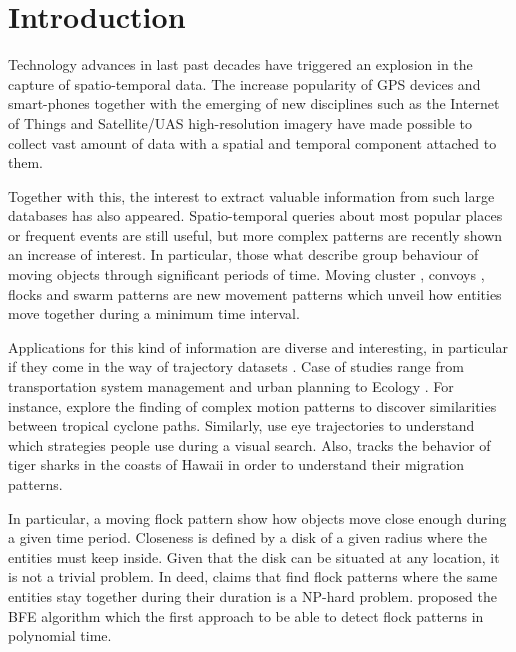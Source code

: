 \section{Introduction}
Technology advances in last past decades have triggered an explosion in the capture of spatio-temporal data.  The increase popularity of GPS devices and smart-phones together with the emerging of new disciplines such as the Internet of Things and Satellite/UAS high-resolution imagery have made possible to collect vast amount of data with a spatial and temporal component attached to them.

Together with this, the interest to extract valuable information from such large databases has also appeared.  Spatio-temporal queries about most popular places or frequent events are still useful, but more complex patterns are recently shown an increase of interest.  In particular, those what describe group behaviour of moving objects through significant periods of time.  Moving cluster \cite{kalnis_discovering_2005}, convoys \cite{jeung_discovery_2008}, flocks \cite{gudmundsson_computing_2006} and swarm patterns \cite{li_swarm:_2010} are new movement patterns which unveil how entities move together during a minimum time interval. 

Applications for this kind of information are diverse and interesting, in particular if they come in the way of trajectory datasets \cite{jeung_trajectory_2011, huang_mining_2015}. Case of studies range from transportation system management and urban planning \cite{di_lorenzo_allaboard:_2016} to Ecology \cite{la_sorte_convergence_2016}.  For instance, \cite{turdukulov_visual_2014} explore the finding of complex motion patterns to discover similarities between tropical cyclone paths.  Similarly, \cite{amor_persistence_2016} use eye trajectories to understand which strategies people use during a visual search. Also, \cite{holland_movements_1999} tracks the behavior of tiger sharks in the coasts of Hawaii in order to understand their migration patterns.

In particular, a moving flock pattern show how objects move close enough during a given time period.  Closeness is defined by a disk of a given radius where the entities must keep inside.  Given that the disk can be situated at any location, it is not a trivial problem.  In deed, \cite{gudmundsson_computing_2006} claims that find flock patterns where the same entities stay together during their duration is a NP-hard problem. \cite{vieira_2009} proposed the BFE algorithm which the first approach to be able to detect flock patterns in polynomial time.

